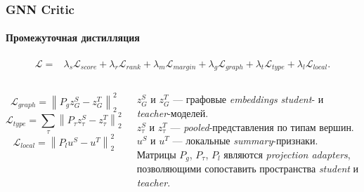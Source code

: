 \documentclass[aspectratio=169]{beamer}
\begin{document}
\begin{frame}
\frametitle{GNN Critic}
\framesubtitle{Промежуточная дистилляция}
\vspace{-0.28cm}
{\fontsize{9.6}{11}\selectfont
\[
\begin{aligned}
\mathcal{L}
={}&
\lambda_s \mathcal{L}_{score}
+
\lambda_r \mathcal{L}_{rank}
+
\lambda_m \mathcal{L}_{margin}
+
\lambda_g \mathcal{L}_{graph}
+
\lambda_t \mathcal{L}_{type}
+
\lambda_l \mathcal{L}_{local}.
\end{aligned}
\]
\vspace{-0.35cm}
\begin{columns}[T,totalwidth=\textwidth]
	\[
	\mathcal{L}_{graph}
	=
	\left\|
	P_g z_G^{S} - z_G^{T}
	\right\|_2^2
	\]
	\vspace{-0.28cm}
	\[
	\mathcal{L}_{type}
	=
	\sum_{\tau}
	\left\|
	P_\tau z_{\tau}^{S} - z_{\tau}^{T}
	\right\|_2^2
	\]
	\vspace{-0.28cm}
	\[
	\mathcal{L}_{local}
	=
	\left\|
	P_l u^{S} - u^{T}
	\right\|_2^2
	\]
	\raggedright
	$z_G^{S}$ и $z_G^{T}$ --- графовые \textit{embeddings} \textit{student}- и \textit{teacher}-моделей.\\[0.08cm]
	$z_{\tau}^{S}$ и $z_{\tau}^{T}$ --- \textit{pooled}-представления по типам вершин.\\[0.08cm]
	$u^{S}$ и $u^{T}$ --- локальные \textit{summary}-признаки.\\[0.08cm]
	Матрицы $P_g$, $P_\tau$, $P_l$ являются \textit{projection adapters}, позволяющими сопоставить пространства \textit{student} и \textit{teacher}.
\end{columns}
}
\end{frame}
\end{document}
